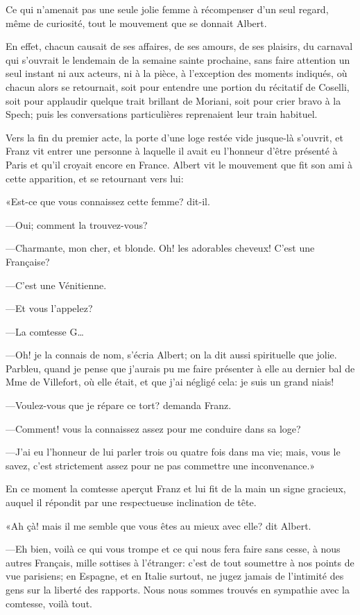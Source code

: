 Ce qui n'amenait pas une seule jolie femme à récompenser d'un seul regard, même de curiosité, tout le mouvement que se donnait Albert. 

En effet, chacun causait de ses affaires, de ses amours, de ses plaisirs, du carnaval qui s'ouvrait le lendemain de la semaine sainte prochaine, sans faire attention un seul instant ni aux acteurs, ni à la pièce, à l'exception des moments indiqués, où chacun alors se retournait, soit pour entendre une portion du récitatif de Coselli, soit pour applaudir quelque trait brillant de Moriani, soit pour crier bravo à la Spech; puis les conversations particulières reprenaient leur train habituel.  

Vers la fin du premier acte, la porte d'une loge restée vide jusque-là s'ouvrit, et Franz vit entrer une personne à laquelle il avait eu l'honneur d'être présenté à Paris et qu'il croyait encore en France. Albert vit le mouvement que fit son ami à cette apparition, et se retournant vers lui: 

«Est-ce que vous connaissez cette femme? dit-il. 

—Oui; comment la trouvez-vous? 

—Charmante, mon cher, et blonde. Oh! les adorables cheveux! C'est une Française? 

—C'est une Vénitienne. 

—Et vous l'appelez? 

—La comtesse G\dots 

—Oh! je la connais de nom, s'écria Albert; on la dit aussi spirituelle que jolie. Parbleu, quand je pense que j'aurais pu me faire présenter à elle au dernier bal de Mme de Villefort, où elle était, et que j'ai négligé cela: je suis un grand niais! 

—Voulez-vous que je répare ce tort? demanda Franz. 

—Comment! vous la connaissez assez pour me conduire dans sa loge?  

—J'ai eu l'honneur de lui parler trois ou quatre fois dans ma vie; mais, vous le savez, c'est strictement assez pour ne pas commettre une inconvenance.» 

En ce moment la comtesse aperçut Franz et lui fit de la main un signe gracieux, auquel il répondit par une respectueuse inclination de tête. 

«Ah çà! mais il me semble que vous êtes au mieux avec elle? dit Albert. 

—Eh bien, voilà ce qui vous trompe et ce qui nous fera faire sans cesse, à nous autres Français, mille sottises à l'étranger: c'est de tout soumettre à nos points de vue parisiens; en Espagne, et en Italie surtout, ne jugez jamais de l'intimité des gens sur la liberté des rapports. Nous nous sommes trouvés en sympathie avec la comtesse, voilà tout. 

